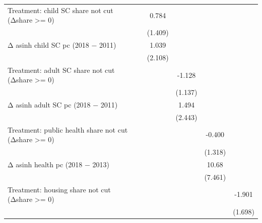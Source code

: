\begin{table}[htbp]
\begin{tabular}{l*{5}{c}}
\addlinespace
Treatment: child SC share not cut (Δshare >= 0)&                     &       0.784         &                     &                     &                     \\
                    &                     &     (1.409)         &                     &                     &                     \\
\addlinespace
Δ asinh child SC pc (2018 − 2011)&                     &       1.039         &                     &                     &                     \\
                    &                     &     (2.108)         &                     &                     &                     \\
\addlinespace
Treatment: adult SC share not cut (Δshare >= 0)&                     &                     &      -1.128         &                     &                     \\
                    &                     &                     &     (1.137)         &                     &                     \\
\addlinespace
Δ asinh adult SC pc (2018 − 2011)&                     &                     &       1.494         &                     &                     \\
                    &                     &                     &     (2.443)         &                     &                     \\
\addlinespace
Treatment: public health share not cut (Δshare >= 0)&                     &                     &                     &      -0.400         &                     \\
                    &                     &                     &                     &     (1.318)         &                     \\
\addlinespace
Δ asinh health pc (2018 − 2013)&                     &                     &                     &       10.68         &                     \\
                    &                     &                     &                     &     (7.461)         &                     \\
\addlinespace
Treatment: housing share not cut (Δshare >= 0)&                     &                     &                     &                     &      -1.901         \\
                    &                     &                     &                     &                     &     (1.698)         \\

\end{tabular}
\end{table}
